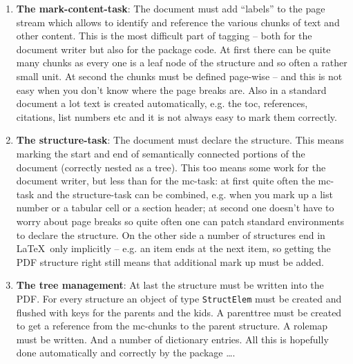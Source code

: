 \documentclass[DIV=12,parskip=half-,bibliography=totoc]{scrartcl}
\newcommand\PDF{PDF}
\begin{document}
\begin{enumerate}
\item
 \textbf{The mark-content-task}: The document must add \enquote{labels} to the page stream which allows to identify and reference the various chunks of text and other content.  This is the most difficult part of tagging -- both for the document writer but also for the package code. At first there can be quite many chunks as every one is a leaf node of the structure and so often a rather small unit.  At second the chunks must be defined page-wise -- and this is not easy when you don't know where the page breaks are. Also in a standard document a lot text is created automatically, e.g. the toc, references, citations, list numbers etc and it is not always easy to mark them correctly.

\item
  \textbf{The structure-task}:  The document must declare the structure. This means marking the start and end of semantically connected portions of the document (correctly nested as a tree). This too means some work for the document writer, but less than for the mc-task: at first quite often the mc-task and the structure-task can be combined, e.g. when you mark up a list number or a tabular cell or a section header; at second one doesn't have to worry about page breaks so quite often one can patch standard environments to declare the structure. On the other side a number of structures end in \LaTeX\ only implicitly -- e.g. an item ends at the next item, so getting the \PDF{} structure right still means that additional mark up must be added.


\item
 \textbf{The tree management}: At last the structure must be written into the \PDF{}. For every structure an object of type \texttt{StructElem} must be  created and flushed with keys for the parents and the kids. A parenttree must be created to get a reference from the mc-chunks to the parent structure. A rolemap must be written. And a number of dictionary entries. All this is hopefully done automatically and correctly by the package \ldots.

\end{enumerate}
\end{document}
